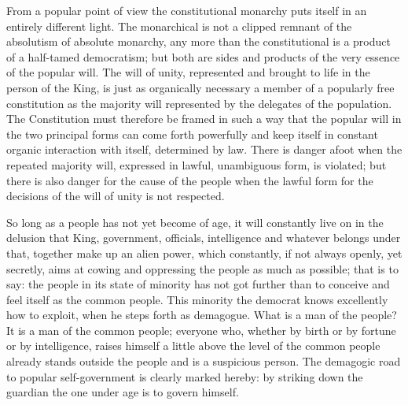 \documentclass[12pt,a4paper,openany]{book}
\newcommand{\opage}[1]{\marginnote{\footnotesize\textit{[#1]}}}
\begin{document}
From a popular point of view the constitutional
monarchy puts itself in an entirely different light. The
monarchical is not a clipped remnant of the absolutism of absolute
monarchy, any more than the constitutional is a
product of a half-tamed democratism; but both
are sides and products of the very essence of the popular will.
The will of unity, represented and brought to life in the person
of the King, is just as organically necessary a member of a
popularly free constitution as the majority will represented
by the delegates of the population. The Constitution must therefore
be framed in such a way that the popular will in the
two principal forms can come forth powerfully and keep itself in
constant organic interaction with itself, determined by law.
\setcounter{footnote}{0}%
\opage{33}There is danger afoot when the repeated majority will, expressed in lawful,
unambiguous form, is violated; but
there is also danger for the cause of the people when the lawful
form for the decisions of the will of unity is not respected.

So long as a people has not yet become of age,
it will constantly live on in the delusion that King,
government, officials, intelligence and whatever belongs under that,
together make up an alien power, which constantly,
if not always openly, yet secretly, aims
at cowing and oppressing the people as much as possible;
that is to say: the people in its state of minority has not
got further than to conceive and feel itself as the common people.
This minority the democrat knows excellently how to exploit,
when he steps forth as demagogue. What is a
man of the people? It is a man of the common people; everyone
who, whether by birth or by fortune or by intelligence,
raises himself a little above the level of the common people already stands
outside the people and is a suspicious person. The demagogic
road to popular self-government is clearly marked
hereby: by striking down the guardian the
one under age is to govern himself.
\end{document}
